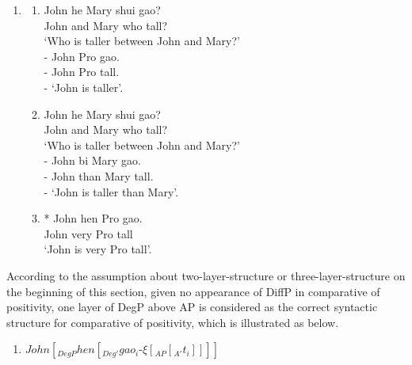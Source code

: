 \documentclass{ctexart}
\begin{document}
\begin{enumerate}
    \item \label{positivity_example_2}
    \begin{enumerate}
        \item \label{positivity_example_2_a}
        John \enspace he Mary shui gao? \\
        John and Mary who tall? \\
        `Who is taller between John and Mary?' \\
        - John Pro gao.\\
        - John Pro tall. \\
        - `John is taller'.

        \item \label{positivity_example_2_b}
        John \enspace he Mary shui gao? \\
        John and Mary who tall? \\
        `Who is taller between John and Mary?' \\
        - John bi Mary gao.\\
        - John than Mary tall. \\
        - `John is taller than Mary'.

        \item \label{positivity_example_3_a}
        * John hen Pro gao.  \\
        \hspace*{0.5em} John very Pro tall \\
        \hspace*{0.5em} `John is very Pro tall'.

    \end{enumerate}
\end{enumerate}

According to the assumption about two-layer-structure or three-layer-structure on the beginning of this section, given no appearance of DiffP in comparative of positivity, one layer of DegP above AP is considered as the correct syntactic structure for comparative of positivity, which is illustrated as below.

\begin{enumerate}
    \item $John [_{DegP} hen [_{Deg'} gao_i \mbox{-} \xi [_{AP} [_{A'}t_i]]]]$
\end{enumerate}
\end{document}
